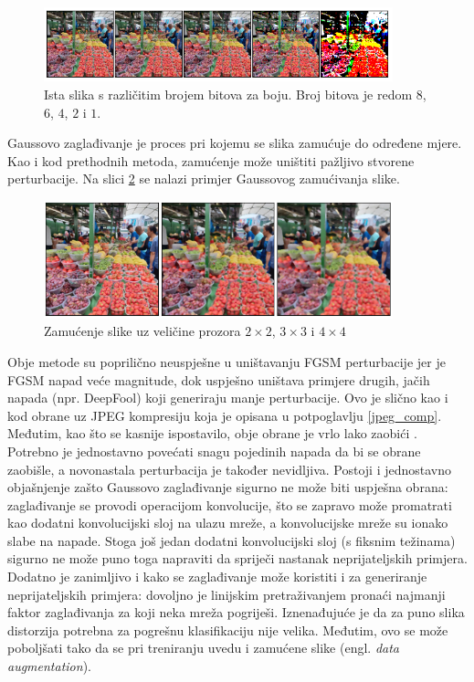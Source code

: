 \documentclass[utf8, diplomski]{fer}
\begin{document}
\begin{figure}[H]
\centering
\includegraphics[width=0.9\textwidth,keepaspectratio]{img/other/squeeze_86421.png}
\caption{Ista slika s različitim brojem bitova za boju. Broj bitova je redom $8$, $6$, $4$, $2$ i $1$.}
\label{fig:squeeze_bits}
\end{figure}

Gaussovo zaglađivanje je proces pri kojemu se slika zamućuje do određene mjere. Kao i kod prethodnih metoda, zamućenje može uništiti pažljivo stvorene perturbacije. Na slici \ref{fig:blur_example} se nalazi primjer Gaussovog zamućivanja slike. 

\begin{figure}[H]
\centering
\includegraphics[width=0.9\textwidth,keepaspectratio]{img/other/blur_example.png}
\caption{Zamućenje slike uz veličine prozora $2\times2$, $3\times3$ i $4\times4$}
\label{fig:blur_example}
\end{figure}

\par 

Obje metode su poprilično neuspješne u uništavanju FGSM perturbacije jer je FGSM napad veće magnitude, dok uspješno uništava primjere drugih, jačih napada (npr. DeepFool) koji generiraju manje perturbacije. Ovo je slično kao i kod obrane uz JPEG kompresiju koja je opisana u potpoglavlju \ref{jpeg_comp}. Međutim, kao što se kasnije ispostavilo, obje obrane je vrlo lako zaobići \citep{bypass_squeezing}. Potrebno je jednostavno povećati snagu pojedinih napada da bi se obrane zaobišle, a novonastala perturbacija je također nevidljiva. Postoji i jednostavno objašnjenje zašto Gaussovo zaglađivanje sigurno ne može biti uspješna obrana: zaglađivanje se provodi operacijom konvolucije, što se zapravo može promatrati kao dodatni konvolucijski sloj na ulazu mreže, a konvolucijske mreže su ionako slabe na napade. Stoga još jedan dodatni konvolucijski sloj (s fiksnim težinama) sigurno ne može puno toga napraviti da spriječi nastanak neprijateljskih primjera. Dodatno je zanimljivo i kako se zaglađivanje može koristiti i za generiranje neprijateljskih primjera: dovoljno je linijskim pretraživanjem pronaći najmanji faktor zaglađivanja za koji neka mreža pogriješi. Iznenađujuće je da za puno slika distorzija potrebna za pogrešnu klasifikaciju nije velika. Međutim, ovo se može poboljšati tako da se pri treniranju uvedu i zamućene slike (engl. \textit{data augmentation}).
\end{document}

